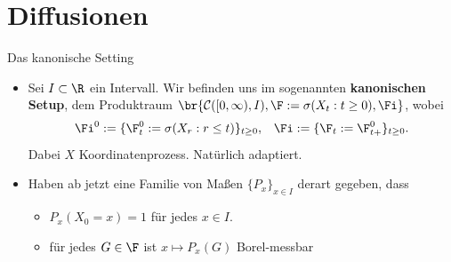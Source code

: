 \section{Diffusionen}

\begin{frame}{Das kanonische Setting}
    \begin{itemize}
        \item Sei $I \subset \R$ ein Intervall. 
        Wir befinden uns im sogenannten \textbf{kanonischen Setup}, dem Produktraum $\br{\mathcal{C}([0, \infty), I), \F := \sigma(X_t: t \geq 0), \Fi}$, wobei \[\Fi^0 := \{\F_t^0 := \sigma(X_r: r \leq t)\}_{t \geq 0}, \;\;\; \Fi := \{\F_t := \F_{t+}^0\}_{t \geq 0}.\] Dabei $X$ Koordinatenprozess. Natürlich adaptiert.
    \item Haben ab jetzt eine Familie von Maßen $\{P_x\}_{x \in I}$ derart gegeben, dass 
    \begin{itemize}
        \item $P_x(X_0 = x) = 1$ für jedes $x \in I$.
        \item für jedes $G \in \F$ ist $x \mapsto P_x(G)$ Borel-messbar
    \end{itemize}
    \end{itemize}
\end{frame}
